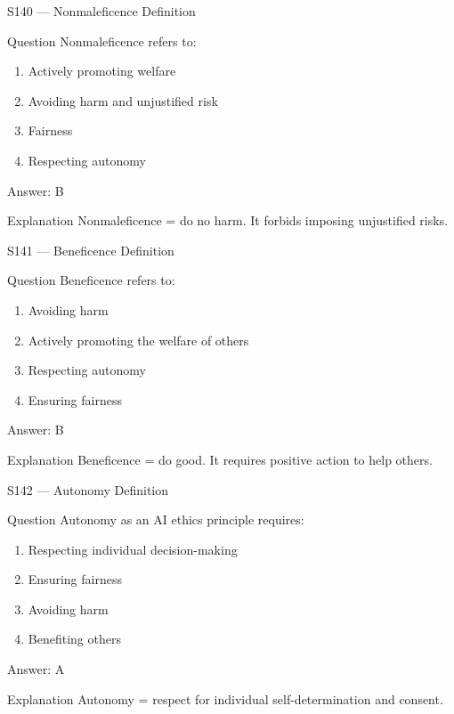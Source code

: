 \documentclass[aspectratio=169,8pt]{beamer}
\begin{document}
	\begin{frame}{S140 --- Nonmaleficence Definition}
		\begin{block}{Question}
			Nonmaleficence refers to:
			\begin{enumerate}
				\item Actively promoting welfare
				\item Avoiding harm and unjustified risk
				\item Fairness
				\item Respecting autonomy
			\end{enumerate}
		\end{block}
		\begin{exampleblock}{Answer: B}\end{exampleblock}
		\begin{block}{Explanation}
			Nonmaleficence = do no harm. It forbids imposing unjustified risks.
		\end{block}
	\end{frame}
	
	\begin{frame}{S141 --- Beneficence Definition}
		\begin{block}{Question}
			Beneficence refers to:
			\begin{enumerate}
				\item Avoiding harm
				\item Actively promoting the welfare of others
				\item Respecting autonomy
				\item Ensuring fairness
			\end{enumerate}
		\end{block}
		\begin{exampleblock}{Answer: B}\end{exampleblock}
		\begin{block}{Explanation}
			Beneficence = do good. It requires positive action to help others.
		\end{block}
	\end{frame}
	
	\begin{frame}{S142 --- Autonomy Definition}
		\begin{block}{Question}
			Autonomy as an AI ethics principle requires:
			\begin{enumerate}
				\item Respecting individual decision-making
				\item Ensuring fairness
				\item Avoiding harm
				\item Benefiting others
			\end{enumerate}
		\end{block}
		\begin{exampleblock}{Answer: A}\end{exampleblock}
		\begin{block}{Explanation}
			Autonomy = respect for individual self-determination and consent.
		\end{block}
	\end{frame}
	
\end{document}
